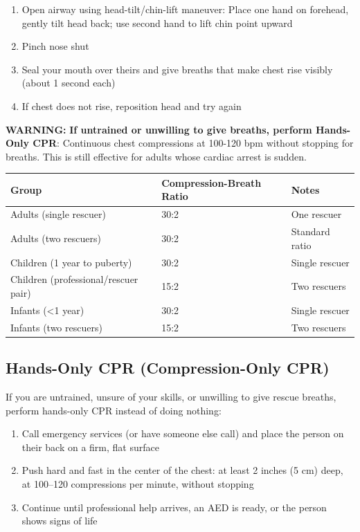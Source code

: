 \begin{enumerate}[leftmargin=*]
\item Open airway using head-tilt/chin-lift maneuver: Place one hand on forehead, gently tilt head back; use second hand to lift chin point upward
\item Pinch nose shut
\item Seal your mouth over theirs and give breaths that make chest rise visibly (about 1 second each)
\item If chest does not rise, reposition head and try again
\end{enumerate}
\textbf{WARNING:} \textbf{If untrained or unwilling to give breaths, perform Hands-Only CPR}: Continuous chest compressions at 100-120 bpm without stopping for breaths. This is still effective for adults whose cardiac arrest is sudden.

\begin{center}
\begin{tabular}{@{}lll@{}}
\hline
\textbf{Group} & \textbf{Compression-Breath Ratio} & \textbf{Notes} \\
\hline
Adults (single rescuer) & 30:2 & One rescuer \\
Adults (two rescuers) & 30:2 & Standard ratio \\
Children (1 year to puberty) & 30:2 & Single rescuer \\
Children (professional/rescuer pair) & 15:2 & Two rescuers \\
Infants (<1 year) & 30:2 & Single rescuer \\
Infants (two rescuers) & 15:2 & Two rescuers \\
\hline
\end{tabular}
\end{center}

\subsection{Hands-Only CPR (Compression-Only CPR)}

If you are untrained, unsure of your skills, or unwilling to give rescue breaths, perform hands-only CPR instead of doing nothing:

\begin{enumerate}[leftmargin=*]
\item Call emergency services (or have someone else call) and place the person on their back on a firm, flat surface
\item Push hard and fast in the center of the chest: at least 2 inches (5 cm) deep, at 100--120 compressions per minute, without stopping
\item Continue until professional help arrives, an AED is ready, or the person shows signs of life
\end{enumerate}


